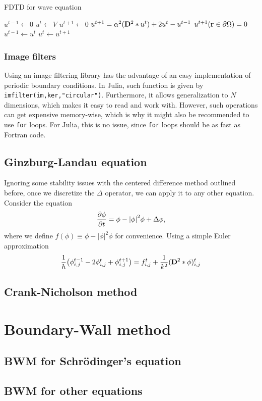 \documentclass[letterpaper,12pt]{article}
\begin{document}
\begin{algorithm}
  \caption{FDTD for wave equation}\label{alg:wave}
  \begin{algorithmic}
    \State $u^{t-1}\gets 0$
    \State $u^{t}\gets V$
    \State $u^{t+1}\gets 0$
    \State $u^{t+1}=\alpha^2(\vb{D}^2\ast u^t)+2u^t-u^{t-1}$
    \State ${u}^{t+1}(\vb{r}\in\partial \Omega) = 0$
    \State $u^{t-1}\gets u^t$
    \State $u^{t}\gets u^{t+1}$ 
    \EndWhile
  \end{algorithmic}
\end{algorithm}
\subsubsection{Image filters}
Using an image filtering library has the advantage of an easy implementation of periodic boundary conditions. In Julia, such function is given by \texttt{imfilter(im,ker,"circular")}. Furthermore, it allows generalization to $N$ dimensions, which makes it easy to read and work with. However, such operations can get expensive memory-wise, which is why it might also be recommended to use \texttt{for} loops. For Julia, this is no issue, since \texttt{for} loops should be as fast as Fortran code.



\subsection{Ginzburg-Landau equation}
Ignoring some stability issues with the centered difference method outlined before, once we discretize the $\Delta$ operator, we can apply it to any other equation. Consider the equation
\begin{equation}
  \pdv{\phi}{t}=\phi-\abs{\phi}^2\phi+\Delta\phi,
\end{equation}
where we define $f(\phi)\equiv\phi-|\phi|^2\phi$ for convenience. Using a simple Euler approximation
\[\frac{1}{h}\qty(\phi_{i,j}^{t-1}-2\phi_{i,j}^t+\phi_{i,j}^{t+1})=f_{i,j}^t+\frac{1}{k^2}(\vb{D}^2\ast \phi)_{i,j}^t\]

\subsection{Crank-Nicholson method}
\section{Boundary-Wall method}
\subsection{BWM for Schr\"odinger's equation}
\subsection{BWM for other equations}
\end{document}
